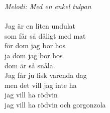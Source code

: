{\footnotesize\textit{Melodi: Med en enkel tulpan}}\\
\\
Jag är en liten undulat\\
som får så dåligt med mat\\
för dom jag bor hos\\
ja dom jag bor hos\\
dom är så snåla.\\
Jag får ju fisk varenda dag\\
men det vill jag inte ha\\
jag vill ha rödvin\\
jag vill ha rödvin och gorgonzola
